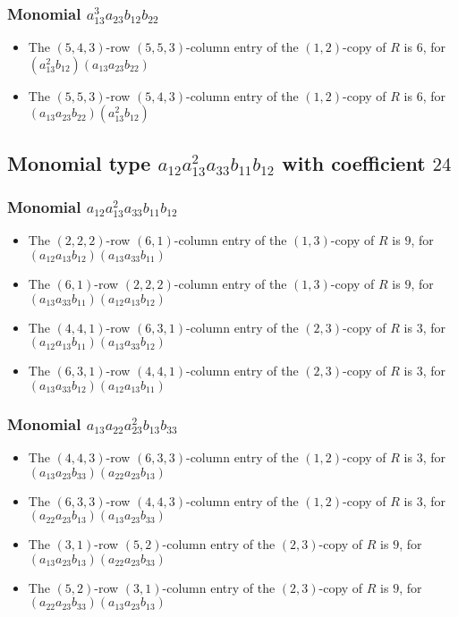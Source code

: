 \documentclass{article}
\begin{document}
\subsubsection{Monomial $ a_{13}^{3} a_{23} b_{12} b_{22} $}

\begin{itemize}
\item The $(5, 4, 3)$-row $(5, 5, 3)$-column entry of the $ \left(1, 2\right) $-copy of $R$ is $ 6 $, for $( a_{13}^{2} b_{12} )( a_{13} a_{23} b_{22} )$ 
\item The $(5, 5, 3)$-row $(5, 4, 3)$-column entry of the $ \left(1, 2\right) $-copy of $R$ is $ 6 $, for $( a_{13} a_{23} b_{22} )( a_{13}^{2} b_{12} )$ 
\end{itemize}
\subsection{Monomial type $ a_{12} a_{13}^{2} a_{33} b_{11} b_{12} $ with coefficient $ 24 $}

\subsubsection{Monomial $ a_{12} a_{13}^{2} a_{33} b_{11} b_{12} $}

\begin{itemize}
\item The $(2, 2, 2)$-row $(6, 1)$-column entry of the $ \left(1, 3\right) $-copy of $R$ is $ 9 $, for $( a_{12} a_{13} b_{12} )( a_{13} a_{33} b_{11} )$ 
\item The $(6, 1)$-row $(2, 2, 2)$-column entry of the $ \left(1, 3\right) $-copy of $R$ is $ 9 $, for $( a_{13} a_{33} b_{11} )( a_{12} a_{13} b_{12} )$ 
\item The $(4, 4, 1)$-row $(6, 3, 1)$-column entry of the $ \left(2, 3\right) $-copy of $R$ is $ 3 $, for $( a_{12} a_{13} b_{11} )( a_{13} a_{33} b_{12} )$ 
\item The $(6, 3, 1)$-row $(4, 4, 1)$-column entry of the $ \left(2, 3\right) $-copy of $R$ is $ 3 $, for $( a_{13} a_{33} b_{12} )( a_{12} a_{13} b_{11} )$ 
\end{itemize}
\subsubsection{Monomial $ a_{13} a_{22} a_{23}^{2} b_{13} b_{33} $}

\begin{itemize}
\item The $(4, 4, 3)$-row $(6, 3, 3)$-column entry of the $ \left(1, 2\right) $-copy of $R$ is $ 3 $, for $( a_{13} a_{23} b_{33} )( a_{22} a_{23} b_{13} )$ 
\item The $(6, 3, 3)$-row $(4, 4, 3)$-column entry of the $ \left(1, 2\right) $-copy of $R$ is $ 3 $, for $( a_{22} a_{23} b_{13} )( a_{13} a_{23} b_{33} )$ 
\item The $(3, 1)$-row $(5, 2)$-column entry of the $ \left(2, 3\right) $-copy of $R$ is $ 9 $, for $( a_{13} a_{23} b_{13} )( a_{22} a_{23} b_{33} )$ 
\item The $(5, 2)$-row $(3, 1)$-column entry of the $ \left(2, 3\right) $-copy of $R$ is $ 9 $, for $( a_{22} a_{23} b_{33} )( a_{13} a_{23} b_{13} )$ 
\end{itemize}
\end{document}
